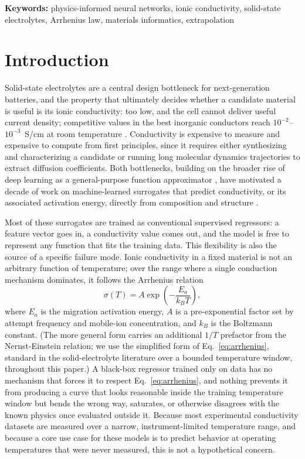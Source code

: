 \documentclass[11pt]{article}
\begin{document}
\noindent\textbf{Keywords:} physics-informed neural networks, ionic conductivity, solid-state electrolytes, Arrhenius law, materials informatics, extrapolation

\section{Introduction}

Solid-state electrolytes are a central design bottleneck for next-generation batteries, and the property that ultimately decides whether a candidate material is useful is its ionic conductivity: too low, and the cell cannot deliver useful current density; competitive values in the best inorganic conductors reach $10^{-2}$–$10^{-3}$~S/cm at room temperature \citep{famprikis2019fundamentals}. Conductivity is expensive to measure and expensive to compute from first principles, since it requires either synthesizing and characterizing a candidate or running long molecular dynamics trajectories to extract diffusion coefficients. Both bottlenecks, building on the broader rise of deep learning as a general-purpose function approximator \citep{lecun2015deep}, have motivated a decade of work on machine-learned surrogates that predict conductivity, or its associated activation energy, directly from composition and structure \citep{sendek2017holistic,sendek2018mldiscovery,butler2018mlmaterials,xie2018cgcnn}.

Most of these surrogates are trained as conventional supervised regressors: a feature vector goes in, a conductivity value comes out, and the model is free to represent any function that fits the training data. This flexibility is also the source of a specific failure mode. Ionic conductivity in a fixed material is not an arbitrary function of temperature; over the range where a single conduction mechanism dominates, it follows the Arrhenius relation
\begin{equation}
\sigma(T) = A\exp\!\left(-\frac{E_a}{k_BT}\right),
\label{eq:arrhenius}
\end{equation}
where $E_a$ is the migration activation energy, $A$ is a pre-exponential factor set by attempt frequency and mobile-ion concentration, and $k_B$ is the Boltzmann constant. (The more general form carries an additional $1/T$ prefactor from the Nernst-Einstein relation; we use the simplified form of Eq.~\ref{eq:arrhenius}, standard in the solid-electrolyte literature over a bounded temperature window, throughout this paper.) A black-box regressor trained only on data has no mechanism that forces it to respect Eq.~\ref{eq:arrhenius}, and nothing prevents it from producing a curve that looks reasonable inside the training temperature window but bends the wrong way, saturates, or otherwise disagrees with the known physics once evaluated outside it. Because most experimental conductivity datasets are measured over a narrow, instrument-limited temperature range, and because a core use case for these models is to predict behavior at operating temperatures that were never measured, this is not a hypothetical concern.
\end{document}
